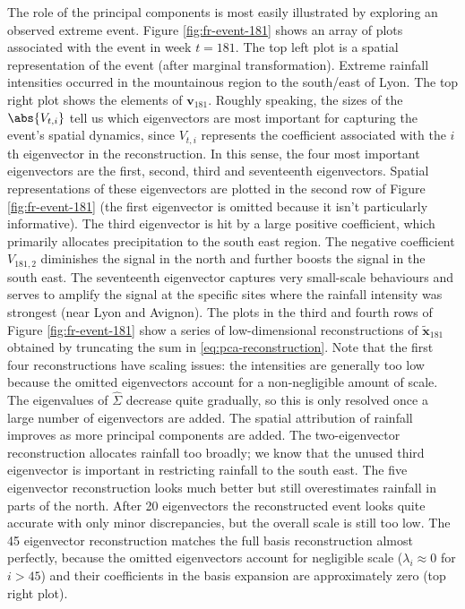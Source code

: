 \documentclass[en-GB, a4paper, nobind]{templates/bathreport}
\begin{document}
The role of the principal components is most easily illustrated by exploring an observed extreme event. Figure \ref{fig:fr-event-181} shows an array of plots associated with the event in week \(t=181\). The top left plot is a spatial representation of the event (after marginal transformation). Extreme rainfall intensities occurred in the mountainous region to the south/east of Lyon. The top right plot shows the elements of \(\bm{v}_{181}\). Roughly speaking, the sizes of the \(\abs{V_{t,i}}\) tell us which eigenvectors are most important for capturing the event's spatial dynamics, since \(V_{t,i}\) represents the coefficient associated with the \(i\)th eigenvector in the reconstruction. In this sense, the four most important eigenvectors are the first, second, third and seventeenth eigenvectors. Spatial representations of these eigenvectors are plotted in the second row of Figure \ref{fig:fr-event-181} (the first eigenvector is omitted because it isn't particularly informative). The third eigenvector is hit by a large positive coefficient, which primarily allocates precipitation to the south east region. The negative coefficient \(V_{181,2}\) diminishes the signal in the north and further boosts the signal in the south east. The seventeenth eigenvector captures very small-scale behaviours and serves to amplify the signal at the specific sites where the rainfall intensity was strongest (near Lyon and Avignon). The plots in the third and fourth rows of Figure \ref{fig:fr-event-181} show a series of low-dimensional reconstructions of \(\tilde{\bm{x}}_{181}\) obtained by truncating the sum in \eqref{eq:pca-reconstruction}. Note that the first four reconstructions have scaling issues: the intensities are generally too low because the omitted eigenvectors account for a non-negligible amount of scale. The eigenvalues of \(\hat{\Sigma}\) decrease quite gradually, so this is only resolved once a large number of eigenvectors are added. The spatial attribution of rainfall improves as more principal components are added. The two-eigenvector reconstruction allocates rainfall too broadly; we know that the unused third eigenvector is important in restricting rainfall to the south east. The five eigenvector reconstruction looks much better but still overestimates rainfall in parts of the north. After 20 eigenvectors the reconstructed event looks quite accurate with only minor discrepancies, but the overall scale is still too low. The 45 eigenvector reconstruction matches the full basis reconstruction almost perfectly, because the omitted eigenvectors account for negligible scale (\(\lambda_i\approx 0\) for \(i>45\)) and their coefficients in the basis expansion are approximately zero (top right plot).
\end{document}
